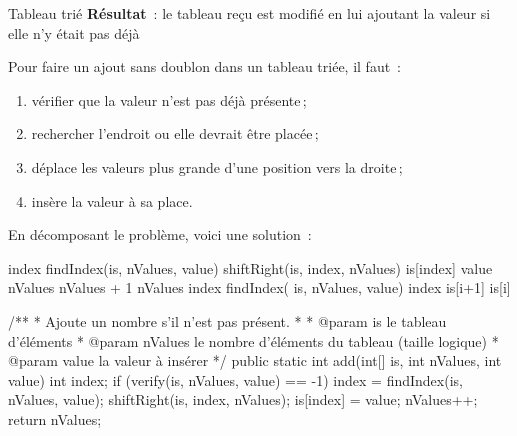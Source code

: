 \begin{Fiche}{Tableau trié}
	\textbf{Résultat}~: le tableau reçu est modifié en lui ajoutant la valeur si
	elle n'y était pas déjà


	Pour faire un ajout sans doublon dans un tableau triée, il faut~:

	\begin{enumerate}
		\item vérifier que la valeur n'est pas déjà présente\,;
		\item rechercher l'endroit ou elle devrait être placée\,;
		\item déplace les valeurs plus grande d'une position vers la droite\,;
		\item insère la valeur à sa place. 
	\end{enumerate}

	En décomposant le problème, voici une solution~:

	\begin{pseudocode}
				\Stmt index \Gets findIndex(is, nValues, value)
				\Stmt shiftRight(is, index, nValues)
				\Let is[index] \Gets value
				\Let nValues \Gets nValues + 1
			\EndIf
			\Return nValues
		\EndAlgo
			\Stmt index \Gets findIndex( is, nValues, value)
				\Return index
			\Else
			\EndIf
		\EndAlgo
				\Let is[i+1] \Gets is[i]
			\EndFor
		\EndAlgo
	\end{pseudocode}

	\begin{java}
/**
 * Ajoute un nombre s'il n'est pas présent.
 * 
 * @param is le tableau d'éléments
 * @param nValues le nombre d'éléments du tableau (taille logique)
 * @param value la valeur à insérer
 */
public static int add(int[] is, int nValues, int value){
	int index;
	if (verify(is, nValues, value) == -1){
		index = findIndex(is, nValues, value);
		shiftRight(is, index, nValues);
		is[index] = value;
		nValues++;
	}
	return nValues;
}


\end{java}
\end{Fiche}
